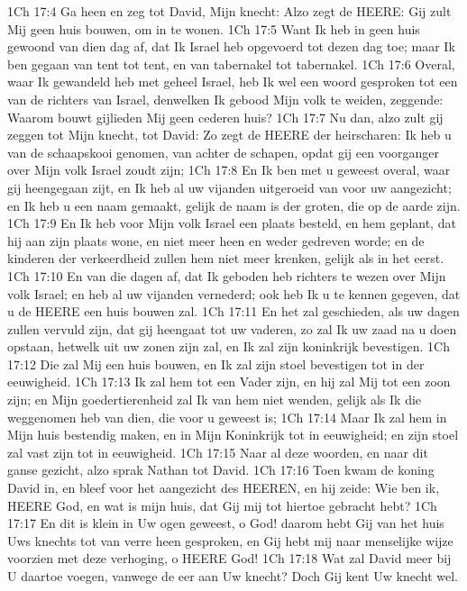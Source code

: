 1Ch 17:4  Ga heen en zeg tot David, Mijn knecht: Alzo zegt de HEERE: Gij zult Mij geen huis bouwen, om in te wonen.
1Ch 17:5  Want Ik heb in geen huis gewoond van dien dag af, dat Ik Israel heb opgevoerd tot dezen dag toe; maar Ik ben gegaan van tent tot tent, en van tabernakel tot tabernakel.
1Ch 17:6  Overal, waar Ik gewandeld heb met geheel Israel, heb Ik wel een woord gesproken tot een van de richters van Israel, denwelken Ik gebood Mijn volk te weiden, zeggende: Waarom bouwt gijlieden Mij geen cederen huis?
1Ch 17:7  Nu dan, alzo zult gij zeggen tot Mijn knecht, tot David: Zo zegt de HEERE der heirscharen: Ik heb u van de schaapskooi genomen, van achter de schapen, opdat gij een voorganger over Mijn volk Israel zoudt zijn;
1Ch 17:8  En Ik ben met u geweest overal, waar gij heengegaan zijt, en Ik heb al uw vijanden uitgeroeid van voor uw aangezicht; en Ik heb u een naam gemaakt, gelijk de naam is der groten, die op de aarde zijn.
1Ch 17:9  En Ik heb voor Mijn volk Israel een plaats besteld, en hem geplant, dat hij aan zijn plaats wone, en niet meer heen en weder gedreven worde; en de kinderen der verkeerdheid zullen hem niet meer krenken, gelijk als in het eerst.
1Ch 17:10  En van die dagen af, dat Ik geboden heb richters te wezen over Mijn volk Israel; en heb al uw vijanden vernederd; ook heb Ik u te kennen gegeven, dat u de HEERE een huis bouwen zal.
1Ch 17:11  En het zal geschieden, als uw dagen zullen vervuld zijn, dat gij heengaat tot uw vaderen, zo zal Ik uw zaad na u doen opstaan, hetwelk uit uw zonen zijn zal, en Ik zal zijn koninkrijk bevestigen.
1Ch 17:12  Die zal Mij een huis bouwen, en Ik zal zijn stoel bevestigen tot in der eeuwigheid.
1Ch 17:13  Ik zal hem tot een Vader zijn, en hij zal Mij tot een zoon zijn; en Mijn goedertierenheid zal Ik van hem niet wenden, gelijk als Ik die weggenomen heb van dien, die voor u geweest is;
1Ch 17:14  Maar Ik zal hem in Mijn huis bestendig maken, en in Mijn Koninkrijk tot in eeuwigheid; en zijn stoel zal vast zijn tot in eeuwigheid.
1Ch 17:15  Naar al deze woorden, en naar dit ganse gezicht, alzo sprak Nathan tot David.
1Ch 17:16  Toen kwam de koning David in, en bleef voor het aangezicht des HEEREN, en hij zeide: Wie ben ik, HEERE God, en wat is mijn huis, dat Gij mij tot hiertoe gebracht hebt?
1Ch 17:17  En dit is klein in Uw ogen geweest, o God! daarom hebt Gij van het huis Uws knechts tot van verre heen gesproken, en Gij hebt mij naar menselijke wijze voorzien met deze verhoging, o HEERE God!
1Ch 17:18  Wat zal David meer bij U daartoe voegen, vanwege de eer aan Uw knecht? Doch Gij kent Uw knecht wel.
